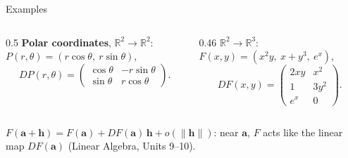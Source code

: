 \documentclass[10pt]{wosm-slides}
\newcommand{\R}{\mathbb{R}}
\newcommand{\norm}[1]{\lVert #1 \rVert}
\newcommand{\va}{\mathbf{a}}
\newcommand{\vh}{\mathbf{h}}
\begin{document}
\begin{frame}{Examples}
  \begin{columns}[T]
    \begin{column}{0.5\textwidth}
      \textbf{Polar coordinates}, $\R^2 \to \R^2$: \\ $P(r, \theta) = (r\cos\theta, \ r\sin\theta)$,
      \[ DP(r, \theta) = \begin{pmatrix} \cos\theta & -r\sin\theta \\ \sin\theta & r\cos\theta \end{pmatrix} . \]
    \end{column}
    \begin{column}{0.46\textwidth}
      $\R^2 \to \R^3$: \\ $F(x, y) = (x^2 y, \ x + y^3, \ e^x)$,
      \[ DF(x, y) = \begin{pmatrix} 2xy & x^2 \\ 1 & 3y^2 \\ e^x & 0 \end{pmatrix} . \]
    \end{column}
  \end{columns}
  \pause
  \begin{remark}
    $F(\va + \vh) = F(\va) + DF(\va)\,\vh + o(\norm{\vh})$: near $\va$, $F$ acts like the linear map
    $DF(\va)$ (Linear Algebra, Units 9--10).
  \end{remark}
\end{frame}
\end{document}
